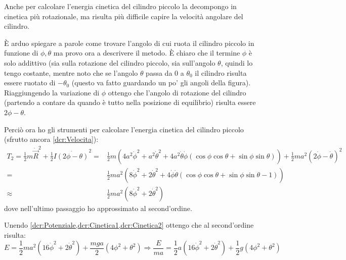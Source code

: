 \documentclass[../main.tex]{subfiles}
\begin{document}
Anche per calcolare l'energia cinetica del cilindro piccolo la decompongo in cinetica più rotazionale, ma risulta più difficile capire la velocità angolare del cilindro.

È arduo spiegare a parole come trovare l'angolo di cui ruota il cilindro piccolo in funzione di $\phi,\theta$ ma provo ora a descrivere il metodo.
È chiaro che il termine $\phi$ è solo addittivo (sia sulla rotazione del cilindro piccolo, sia sull'angolo $\theta$, quindi lo tengo costante, mentre noto che se l'angolo $\theta$ passa da $0$ a $\theta_0$ il cilindro risulta essere ruotato di $-\theta_0$ (questo va fatto guardando un po' gli angoli della figura).
Riaggiungendo la variazione di $\phi$ ottengo che l'angolo di rotazione del cilindro (partendo a contare da quando è tutto nella posizione di equilibrio) risulta essere $2\phi-\theta$.

Perciò ora ho gli strumenti per calcolare l'energia cinetica del cilindro piccolo (sfrutto ancora \cref{dcr:Velocita}):
\begin{equation}\begin{split}\label{dcr:Cinetica2}
	T_2=\frac 12 m {\dot{\vec R}}^2+\frac 12 I \dot{(2\phi-\theta)}^2=&
	\frac12m\left(4a^2{\dot\phi}^2+a^2{\dot\theta}^2+4a^2\dot\theta\dot\phi(\cos\phi\cos\theta+\sin\phi\sin\theta)\right)
	+\frac12ma^2\left(2\dot\phi-\dot\theta\right)^2 \\
	=& \frac 12ma^2\left(8{\dot\phi}^2+2{\dot\theta}^2
	+4\dot\phi\dot\theta(\cos\phi\cos\theta+\sin\phi\sin\theta-1)\right) \\
	\approx & \frac12ma^2\left(8{\dot\phi}^2+2{\dot\theta}^2\right)
\end{split}\end{equation}
dove nell'ultimo passaggio ho approssimato al second'ordine.

Unendo \cref{dcr:Potenziale,dcr:Cinetica1,dcr:Cinetica2} ottengo che al second'ordine risulta:
\begin{equation}\label{dcr:Energia}
	E=\frac12ma^2\left(16{\dot\phi}^2+2{\dot\theta}^2\right)+\frac{mga}2\left(4\phi^2+\theta^2\right)
	\Rightarrow \frac{E}{ma}=
	\frac12a\left(16{\dot\phi}^2+2{\dot\theta}^2\right)
	+\frac12g\left(4\phi^2+\theta^2\right)
\end{equation}
\end{document}
